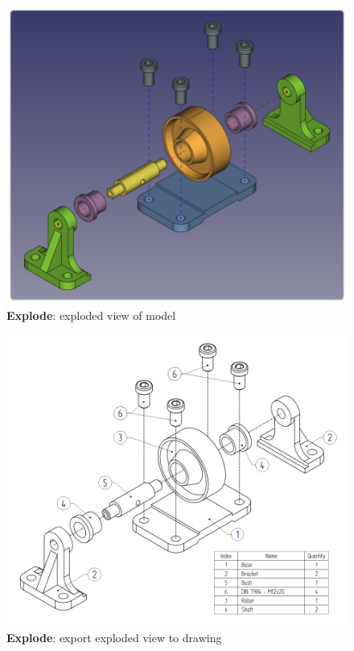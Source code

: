 \documentclass[a4paper,12pt]{article}
\begin{document}
\begin{figure}[htp]
	\centering
	\includegraphics[scale=0.42]{img/exploded_m_result.png}
	\caption{\textbf{Explode}: exploded view of model}
	\label{sec:exploded_m_result}
\end{figure}

\begin{figure}[htp]
	\centering
	\includegraphics[scale=0.42]{img/exploded_d_result.png}
	\caption{\textbf{Explode}: export exploded view to drawing}
	\label{sec:exploded_d_result}
\end{figure}
\end{document}
